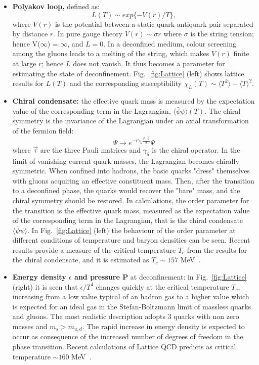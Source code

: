 \begin{itemize}
\item \textbf{Polyakov loop,} defined as:
\begin{equation}
L(T)\sim exp\{-V(r)/T\},
\end{equation}
where $V(r)$ is the potential between a static quark-antiquark pair separated by distance $r$. 
In pure gauge theory $V(r)\sim \sigma r$ where $\sigma$ is the string tension; hence V($\infty$) = $\infty$, 
and $L = 0$. In a deconfined medium, colour screening among the gluons leads to a melting of the 
string, which makes $V(r)$ finite at large $r$; hence $L$ does not vanish. It thus becomes a parameter 
for estimating the state of deconfinement. Fig.~\ref{fig:Lattice} (left) shows lattice results for $L(T)$ and the 
corresponding susceptibility $\chi_L(T)\sim \langle T^2 \rangle - \langle T \rangle ^2$. 
\item \textbf{Chiral condensate: }the effective quark mass is measured by the expectation value 
of the corresponding term in the Lagrangian, $\langle  \bar{\psi}\psi\rangle (T)$. The chiral symmetry is the invariance of the Lagrangian under an axial transformation of the fermion field:
\begin{equation}
\Psi \rightarrow e^{-i \gamma_{5} \frac{\vec{\tau} \cdot \vec{\theta}}{2}}\Psi
\end{equation}
where $\vec{\tau}$ are the three Pauli matrices and $\gamma_5$ is the chiral operator. In the limit of 
vanishing current quark masses, the Lagrangian becomes chirally symmetric. When confined into 
hadrons, the basic quarks "dress" themselves with gluons acquiring an effective constituent mass. 
Then, after the transition to a deconfined phase, the quarks would recover the "bare" mass, and the 
chiral symmetry should be restored. In calculations, the order parameter for the transition is the effective 
quark mass, measured as the expectation value of the corresponding term in the Lagrangian, that is the 
chiral condensate $\langle \overline{\psi}\psi \rangle$. In Fig.~\ref{fig:Lattice} (left) the behaviour of 
the order parameter at different conditions of temperature and baryon densities can be seen. 
Recent results provide a measure of the critical temperature $T_c$ from the results for the chiral condensate, 
and it is estimated as $T_c \sim 157 $ MeV~\cite{Borsanyi:2011bn}.
\item \textbf{Energy density $\epsilon$ and pressure P} at deconfinement: in Fig.~\ref{fig:Lattice} (right) it 
is seen that $\epsilon/T^4$ changes quickly at the critical temperature $T_c$, increasing from a low 
value typical of an hadron gas to a higher value which is expected for an ideal gas in the Stefan-Boltzmann limit of 
massless quarks and gluons. The most realistic description adopts 3 quarks with non zero masses and $m_s > m_{u,d}$. 
The rapid increase in energy density is expected to occur as consequence of the increased number of degrees of 
freedom in the phase transition. Recent calculations of Lattice QCD predicts as critical temperature $ \sim 160$ MeV~\cite{Karsch:2001vs}.

\end{itemize}


